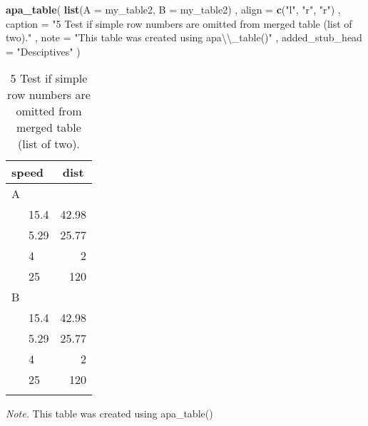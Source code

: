 \documentclass[english,man]{apa6}
\newenvironment{Shaded}{\begin{snugshade}}{\end{snugshade}}
\newcommand{\KeywordTok}[1]{\textcolor[rgb]{0.13,0.29,0.53}{\textbf{{#1}}}}
\newcommand{\DataTypeTok}[1]{\textcolor[rgb]{0.13,0.29,0.53}{{#1}}}
\newcommand{\CharTok}[1]{\textcolor[rgb]{0.31,0.60,0.02}{{#1}}}
\newcommand{\StringTok}[1]{\textcolor[rgb]{0.31,0.60,0.02}{{#1}}}
\newcommand{\NormalTok}[1]{{#1}}
\begin{document}
\begin{Shaded}
\begin{Highlighting}[]
\KeywordTok{apa_table}\NormalTok{(}
  \KeywordTok{list}\NormalTok{(}\DataTypeTok{A =} \NormalTok{my_table2, }\DataTypeTok{B =} \NormalTok{my_table2)}
  \NormalTok{, }\DataTypeTok{align =} \KeywordTok{c}\NormalTok{(}\StringTok{"l"}\NormalTok{, }\StringTok{"r"}\NormalTok{, }\StringTok{"r"}\NormalTok{)}
  \NormalTok{, }\DataTypeTok{caption =} \StringTok{"5 Test if simple row numbers are omitted from merged table (list of two)."}
  \NormalTok{, }\DataTypeTok{note =} \StringTok{"This table was created using apa}\CharTok{\textbackslash{}\textbackslash{}}\StringTok{_table()"}
  \NormalTok{, }\DataTypeTok{added_stub_head =} \StringTok{"Desciptives"}
\NormalTok{)}
\end{Highlighting}
\end{Shaded}

\begin{table}[tbp]
\begin{center}
\begin{threeparttable}
\caption{\label{tab:unnamed-chunk-4}5 Test if simple row numbers are omitted from merged table (list of two).}
\begin{tabular}{lr}
\toprule
speed & \multicolumn{1}{c}{dist}\\
\midrule
A & \\
\ \ \ 15.4 & 42.98\\
\ \ \ 5.29 & 25.77\\
\ \ \ 4 & 2\\
\ \ \ 25 & 120\\
B & \\
\ \ \ 15.4 & 42.98\\
\ \ \ 5.29 & 25.77\\
\ \ \ 4 & 2\\
\ \ \ 25 & 120\\
\bottomrule
\addlinespace
\end{tabular}
\begin{tablenotes}[para]
\textit{Note.} This table was created using apa\_table()
\end{tablenotes}
\end{threeparttable}
\end{center}
\end{table}
\end{document}
